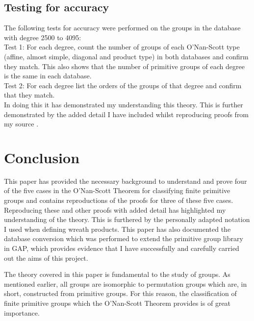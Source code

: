 \documentclass[]{article}
\theoremstyle{definition}
\begin{document}
\subsection{Testing for accuracy}

The following tests for accuracy were performed on the groups in the database with degree 2500 to 4095: \\
Test 1: For each degree, count the number of groups of each O'Nan-Scott type (affine, almost simple, diagonal and product type) in both databases and confirm they match. This also shows that the number of primitive groups of each degree is the same in each database. \\
Test 2: For each degree list the orders of the groups of that degree and confirm that they match. \\

\clearpage
In doing this it has demonstrated my understanding this theory. This is further demonstrated by the added detail I have included whilst reproducing proofs from my source \cite{dm}. 

\section{Conclusion}
This paper has provided the necessary background to understand and prove four of the five cases in the O'Nan-Scott Theorem for classifying finite primitive groups and contains reproductions of the proofs for three of these five cases. Reproducing these and other proofs with added detail has highlighted my understanding of the theory. This is furthered by the personally adapted notation I used when defining wreath products. This paper has also documented the database conversion which was performed to extend the primitive group library in GAP, which provides evidence that I have successfully and carefully carried out the aims of this project.

The theory covered in this paper is fundamental to the study of groups. As mentioned earlier, all groups are isomorphic to permutation groups which are, in short, constructed from primitive groups. For this reason, the classification of finite primitive groups which the O'Nan-Scott Theorem provides is of great importance.


\clearpage
\end{document}
